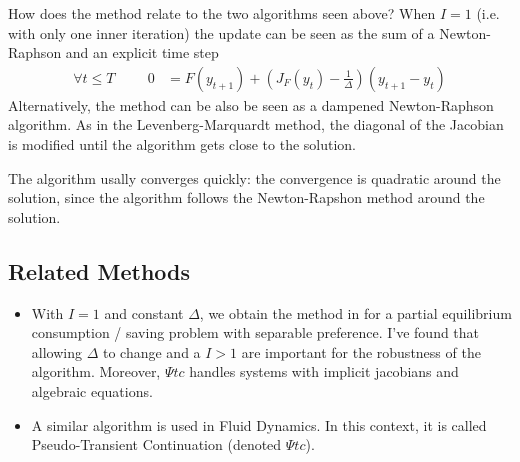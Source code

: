 \documentclass[english]{article}
\begin{document}
How does the method relate to the two algorithms seen above? When $I =1$ (i.e. with only one inner iteration) the update can be seen as the sum of a Newton-Raphson and an explicit time step
\begin{align*}
	\forall t \leq T \hspace{1cm} 0&= F(y_{t+1}) + (J_{F}(y_t) - \frac{1}{\Delta})(y_{t+1} -y_{t})
\end{align*}
Alternatively, the method can be also be seen as a dampened Newton-Raphson algorithm. As in the Levenberg-Marquardt method, the diagonal of the Jacobian is modified until the algorithm gets close to the solution.

The algorithm usally converges quickly: the convergence is quadratic around the solution, since the algorithm follows the Newton-Rapshon method around the solution.

\subsection{Related Methods}
	
\begin{itemize}
	\item 
	With $I=1$ and constant $\Delta$, we obtain the method in \citet{achdou2014heterogeneous} for a partial equilibrium consumption / saving  problem with separable preference. I've found that allowing $\Delta$ to change  and a $I > 1$ are important for the robustness of the algorithm. Moreover, $\Psi tc$ handles systems with implicit jacobians and algebraic equations.

	\item 
	A similar algorithm is used in Fluid Dynamics. In this context, it is called Pseudo-Transient Continuation (denoted $\Psi tc$). 
\end{itemize}
\end{document}

